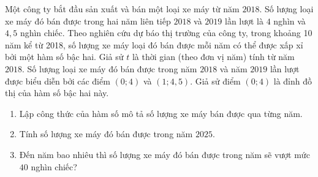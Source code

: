 \begin{bt}%
	Một công ty bắt đầu sản xuất và bán một loại xe máy từ năm $2018$. Số lượng loại xe máy đó bán được trong hai năm liên tiếp $2018$ và $2019$ lần lượt là $4$ nghìn và $4{,}5$ nghìn chiếc. Theo nghiên cứu dự báo thị trường của công ty, trong khoảng 10 năm kể từ 2018, số lượng xe máy loại đó bán được mỗi năm có thể được xấp xỉ bởi một hàm số bậc hai. Giả sử $t$ là thời gian (theo đơn vị năm) tính từ năm $2018$. Số lượng loại xe máy đó bán được trong năm $2018$ và năm $2019$ lần lượt được biểu diễn bởi các điểm $( 0;4 )$ và $( 1;4{,}5 )$. Giả sử điểm $( 0;4 )$ là đỉnh đồ thị của hàm số bậc hai này.
	\begin{enumerate}
		\item Lập công thức của hàm số mô tả số lượng xe máy bán được qua từng năm.
		\item Tính số lượng xe máy đó bán được trong năm $2025$.
		\item Đến năm bao nhiêu thì số lượng xe máy đó bán được trong năm sẽ vượt mức $40$ nghìn chiếc?
	\end{enumerate}
\end{bt}

